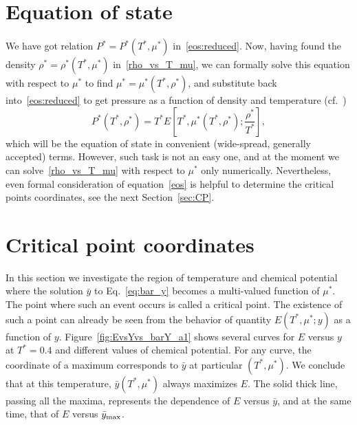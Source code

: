\documentclass[12pt]{article}
\numberwithin{equation}{section}
\begin{document}
	
	\section{Equation of state}
	We have got relation $P^* = P^*(T^*, \mu^*)$ in~\eqref{eos:reduced}. Now, having found the density $\rho^* = \rho^*(T^*,\mu^*)$ in~\eqref{rho_vs_T_mu}, we can formally solve this equation with respect to $\mu^*$ to find $\mu^* = \mu^*(T^*,\rho^*)$, and substitute back into~\eqref{eos:reduced} to get pressure as a function of density and temperature (cf.~\cite[(2.28)]{KKD20})
	\begin{equation}
		\label{eos}
		P^*(T^*,\rho^*) = T^* E\left[T^*, \mu^*(T^*,\rho^*); \frac{\rho^*}{T^*}\right],
	\end{equation}
	which will be the equation of state in convenient (wide-spread, generally accepted) terms. However, such task is not an easy one, and at the moment we can solve~\eqref{rho_vs_T_mu} with respect to $\mu^*$ only numerically. Nevertheless, even formal consideration of equation~\eqref{eos} is helpful to determine the critical points coordinates, see the next Section~\ref{sec:CP}.
	
	\pagebreak
	\section{\label{sec:CP} Critical point coordinates}
	
	In this section we investigate the region of temperature and chemical potential where the solution $\bar{y}$ to Eq.~\eqref{eq:bar_y} becomes a multi-valued function of $\mu^*$. The point where such an event occurs is called a critical point. The existence of such a point can already be seen from the behavior of quantity $E(T^*,\mu^*;y)$ as a function of $y$. Figure~\ref{fig:EvsYvs_barY_a1} shows several curves for $E$ versus $y$ at $T^*=0.4$ and different values of chemical potential. For any curve, the coordinate of a maximum corresponds to $\bar{y}$ at particular $(T^*,\mu^*)$. We conclude that at this temperature, $\bar{y}(T^*,\mu^*)$ always maximizes $E$. The solid thick line, passing all the maxima, represents the dependence of $E$ versus $\bar{y}$, and at the same time, that of $E$ versus $\bar{y}_{\rm max}$.
	
\end{document}
